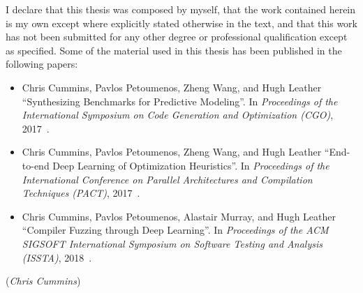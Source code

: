 I declare that this thesis was composed by myself, that the work contained herein is my own except where explicitly stated otherwise in the text, and that this work has not been submitted for any other degree or professional qualification except as specified. Some of the material used in this thesis has been published in the following papers:
\begin{itemize}
	\item Chris Cummins, Pavlos Petoumenos, Zheng Wang, and Hugh Leather ``Synthesizing Benchmarks for Predictive Modeling''. In \emph{Proceedings of the International Symposium on Code Generation and Optimization (CGO)}, 2017~\cite{Cummins2017a}.
	\item Chris Cummins, Pavlos Petoumenos, Zheng Wang, and Hugh Leather ``End-to-end Deep Learning of Optimization Heuristics''. In \emph{Proceedings of the International Conference on Parallel Architectures and Compilation Techniques (PACT)}, 2017~\cite{Cummins2017b}.
	\item Chris Cummins, Pavlos Petoumenos, Alastair Murray, and Hugh Leather ``Compiler Fuzzing through Deep Learning''. In \emph{Proceedings of the ACM SIGSOFT International Symposium on Software Testing and Analysis (ISSTA)}, 2018~\cite{Cummins2018}.
\end{itemize}
\vspace{1in}\raggedleft({\em Chris Cummins\/})
